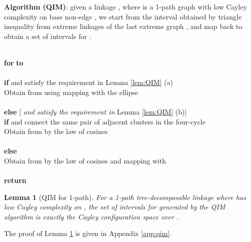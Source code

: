 \documentclass[secthm,amsthm,english]{article}
\newtheorem{lemma}{Lemma}
\theoremstyle{definition}
\theoremstyle{remark}
\begin{document}
\noindent\textbf{Algorithm (QIM)}: 
given a linkage , where  is a 1-path graph with low Cayley complexity on base non-edge , 
we start from the interval  obtained by triangle inequality from extreme linkages of the last extreme graph , and map back to obtain a set  of intervals for . 

\smallskip

\indent    \\
\indent \textbf{for}  \textbf{to}  \hspace{10pt} \\
\indent {}\\
\indent \indent \textbf{if}  and  satisfy the requirement in Lemma \ref{lem:QIM} (a) \\
\indent \indent \indent Obtain  from  using mapping with the ellipse   \\
\indent \indent {} \\
\indent \indent \textbf{else} \hspace{10pt} [\textit{ and  satisfy the requirement in} Lemma \ref{lem:QIM} (b)] \\
\indent \indent \indent \textbf{if}  and  connect the same pair of adjacent clusters in the four-cycle \\
\indent \indent \indent \indent Obtain  from  by the law of cosines \\
\indent \indent \indent {} \\
\indent \indent \indent \textbf{else}\\ \indent\indent\indent\indent Obtain  from  by the law of cosines and mapping with  \\
\indent \indent \indent {} \\
\indent \textbf{return} 










\begin{lemma}[QIM for 1-path] \label{lem:QIM-1-path}
For a 1-path tree-decomposable linkage  where  has low Cayley complexity on , the set  of intervals for  generated by the QIM algorithm is exactly the Cayley configuration space over . 
\end{lemma}

The proof of Lemma \ref{lem:QIM-1-path} is given in Appendix \ref{app:qim}. 
\end{document}
